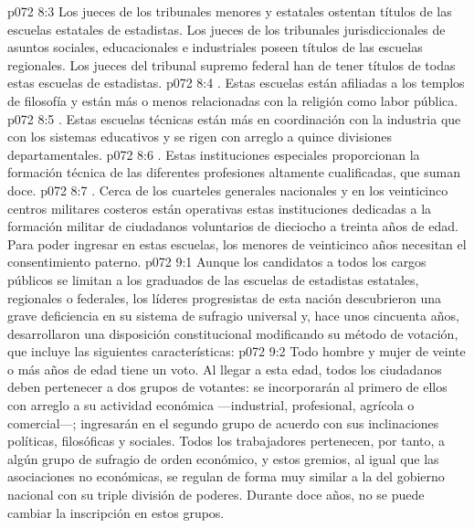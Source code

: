 \vs p072 8:3 Los jueces de los tribunales menores y estatales ostentan títulos de las escuelas estatales de estadistas. Los jueces de los tribunales jurisdiccionales de asuntos sociales, educacionales e industriales poseen títulos de las escuelas regionales. Los jueces del tribunal supremo federal han de tener títulos de todas estas escuelas de estadistas.
\vs p072 8:4 . Estas escuelas están afiliadas a los templos de filosofía y están más o menos relacionadas con la religión como labor pública.
\vs p072 8:5 . Estas escuelas técnicas están más en coordinación con la industria que con los sistemas educativos y se rigen con arreglo a quince divisiones departamentales.
\vs p072 8:6 . Estas instituciones especiales proporcionan la formación técnica de las diferentes profesiones altamente cualificadas, que suman doce.
\vs p072 8:7 . Cerca de los cuarteles generales nacionales y en los veinticinco centros militares costeros están operativas estas instituciones dedicadas a la formación militar de ciudadanos voluntarios de dieciocho a treinta años de edad. Para poder ingresar en estas escuelas, los menores de veinticinco años necesitan el consentimiento paterno.
\vs p072 9:1 Aunque los candidatos a todos los cargos públicos se limitan a los graduados de las escuelas de estadistas estatales, regionales o federales, los líderes progresistas de esta nación descubrieron una grave deficiencia en su sistema de sufragio universal y, hace unos cincuenta años, desarrollaron una disposición constitucional modificando su método de votación, que incluye las siguientes características:
\vs p072 9:2 Todo hombre y mujer de veinte o más años de edad tiene un voto. Al llegar a esta edad, todos los ciudadanos deben pertenecer a dos grupos de votantes: se incorporarán al primero de ellos con arreglo a su actividad económica ---industrial, profesional, agrícola o comercial---; ingresarán en el segundo grupo de acuerdo con sus inclinaciones políticas, filosóficas y sociales. Todos los trabajadores pertenecen, por tanto, a algún grupo de sufragio de orden económico, y estos gremios, al igual que las asociaciones no económicas, se regulan de forma muy similar a la del gobierno nacional con su triple división de poderes. Durante doce años, no se puede cambiar la inscripción en estos grupos.
